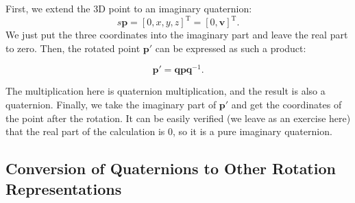 First, we extend the 3D point to an imaginary quaternion:
\[s
\mathbf{p} = [0, x, y, z]^\mathrm{T} = [0, \mathbf{v}]^\mathrm{T}. 
\]
We just put the three coordinates into the imaginary part and leave the real part to zero. Then, the rotated point $ \mathbf {p}' $ can be expressed as such a product:

\begin{equation}\label{eq:rotate-with-quaternion}
\mathbf{p}' = \mathbf{q} \mathbf{p} \mathbf{q}^{-1}.
\end{equation}

The multiplication here is quaternion multiplication, and the result is also a quaternion. Finally, we take the imaginary part of $ \mathbf{p}' $ and get the coordinates of the point after the rotation. It can be easily verified (we leave as an exercise here) that the real part of the calculation is 0, so it is a pure imaginary quaternion.

\subsection{Conversion of Quaternions to Other Rotation Representations}

